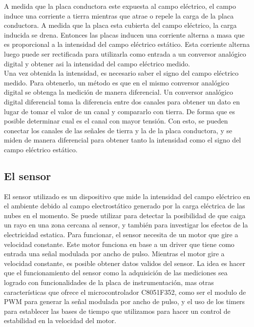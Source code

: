 A medida que la placa conductora este expuesta al campo eléctrico, el campo induce una corriente a tierra mientras que atrae o repele la carga de la placa conductora. A medida que la placa esta cubierta del campo eléctrico, la carga inducida se drena. Entonces las placas inducen una corriente alterna a masa que es proporcional a la intensidad del campo eléctrico estático. Esta corriente alterna luego puede ser rectificada para utilizarla como entrada a un conversor analógico digital y obtener asi la intensidad del campo eléctrico medido. \\

Una vez obtenida la intensidad, es necesario saber el signo del campo eléctrico medido. Para obtenerlo, un método es que en el mismo conversor analógico digital se obtenga la medición de manera diferencial. Un conversor analógico digital diferencial toma la diferencia entre dos canales para obtener un dato en lugar de tomar el valor de un canal y compararlo con tierra. De forma que es posible determinar cual es el canal con mayor tensión. Con esto, se pueden conectar los canales de las señales de tierra y la de la placa conductora, y se miden de manera diferencial para obtener tanto la intensidad como el signo del campo eléctrico estático.
\cite{fieldmill}

\subsection{El sensor} %
\label{it6:sub:el_sensor}

El sensor utilizado es un dispositivo que mide la intensidad del campo eléctrico en el ambiente debido al campo electrostático generado por la carga eléctrica de las nubes en el momento. Se puede utilizar para detectar la posibilidad de que caiga un rayo en una zona cercana al sensor, y también para investigar los efectos de la electricidad estatica. Para funcionar, el sensor necesita de un motor que gire a velocidad constante. Este motor funciona en base a un driver que tiene como entrada una señal modulada por ancho de pulso.
Mientras el motor gire a velocidad constante, es posible obtener datos validos del sensor. La idea es hacer que el funcionamiento del sensor como la adquisición de las mediciones sea logrado con funcionalidades de la placa de instrumentación, mas otras características que ofrece el microcontrolador C8051F352, como ser el modulo de PWM para generar la señal modulada por ancho de pulso, y el uso de los timers para establecer las bases de tiempo que utilizamos para hacer un control de estabilidad en la velocidad del motor. \\

